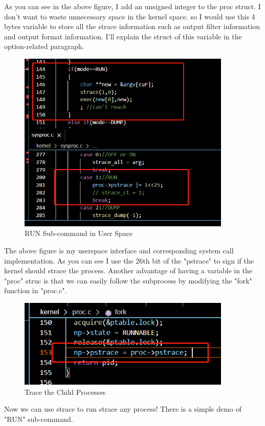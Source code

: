 \documentclass[11pt,oneside,a4paper]{article}
\begin{document}
As you can see in the above figure, I add an unsigned integer to the proc struct.
I don't want to waste unnecessary space in the kernel space.
so I would use this 4 bytes variable to store all the strace information such as 
output filter information and output format information. I'll explain the struct of
this variable in the option-related paragraph.

\begin{figure}[H]
    \includegraphics[width=4.00in]{1-16.png}
    \centering
    \caption{RUN Sub-command in User Space}
\end{figure}

The above figure is my userspace interface and corresponding system call implementation.
As you can see I use the 26th bit of the "pstrace" to sign if the kernel should strace
the process. Another advantage of having a variable in the "proc" struc is that we can 
easily follow the subprocess by modifying the "fork" function in "proc.c".

\begin{figure}[H]
    \includegraphics[width=4.00in]{1-17.png}
    \centering
    \caption{Trace the Child Processes}
\end{figure}

Now we can use strace to run strace any process! There is a simple demo of "RUN" 
sub-command.
\end{document}
